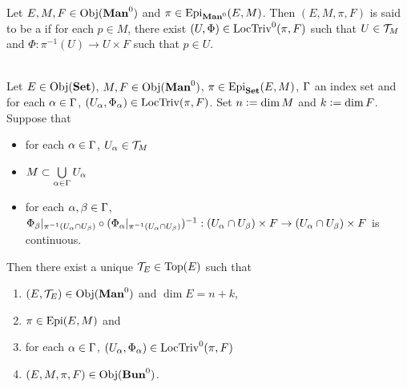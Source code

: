 \documentclass{book}
\begin{document}
	\begin{defn} 
		Let $E,M, F \in \operatorname{Obj}(\operatorname*{\text{\textbf{Man}}^0})$ and $\pi \in \operatorname{Epi}_{\operatorname*{\text{\textbf{Man}}^0}}(E, M)$. Then $(E, M, \pi, F)$ is said to be a  if for each $p \in M$, there exist $(U, \Phi) \in \text{LocTriv}^0(\pi, F)$ such that $U \in \mathcal{T}_M$ and $\Phi: \pi^{-1}(U) \rightarrow U \times F$ such that $p \in U$.
	\end{defn}
	
	\begin{defn}
		 
	\end{defn}

	\begin{ex}   \\
		Let $E \in \operatorname{Obj}(\text{\textbf{Set}})$, $M, F \in \operatorname{Obj}(\operatorname*{\text{\textbf{Man}}^0})$, $\pi \in \operatorname{Epi}_{\text{\textbf{Set}}}(E, M)$, $\Gamma$ an index set and for each $\alpha \in \Gamma$, $(U_{\alpha} , \Phi_{\alpha}) \in \text{LocTriv}(\pi, F)$. Set $n \vcentcolon= \dim M$ and $k \vcentcolon= \dim F$. Suppose that 
		\begin{itemize}
			\item for each $\alpha \in \Gamma$, $U_{\alpha} \in \mathcal{T}_M$
			\item $M \subset \bigcup\limits_{\alpha \in \Gamma} U_{\alpha}$ 
			\item for each $\alpha,\beta \in \Gamma$, $\Phi_{\beta}|_{\pi^{-1}(U_{\alpha} \cap U_{\beta})} \circ (\Phi_{\alpha}|_{\pi^{-1}(U_{\alpha} \cap U_{\beta})})^{-1}: (U_{\alpha} \cap U_{\beta}) \times F \rightarrow  (U_{\alpha} \cap U_{\beta}) \times F$ is continuous.
		\end{itemize}
		Then there exist a unique $\mathcal{T}_E \in \operatorname*{\text{Top}}(E)$ such that
		\begin{enumerate}
			\item $(E, \mathcal{T}_E) \in \operatorname{Obj}(\operatorname*{\text{\textbf{Man}}^0})$ and $\dim E = n + k$,
			\item $\pi \in \operatorname{Epi}(E, M)$ and 
			\item for each $\alpha \in \Gamma$, $(U_{\alpha}, \Phi_{\alpha}) \in \text{LocTriv}^0(\pi, F)$
			\item $(E, M, \pi, F) \in \operatorname{Obj}(\operatorname*{\text{\textbf{Bun}}^0})$.
		\end{enumerate}
	\end{ex}
	
\end{document}
